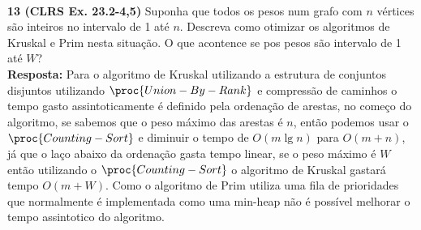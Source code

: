 \\[6pt]
\noindent \textbf{13 (CLRS Ex. 23.2-4,5)} Suponha que todos os pesos num grafo com $n$ vértices são inteiros no intervalo de 1 até $n$. Descreva como otimizar os algoritmos de Kruskal e Prim nesta situação. O que acontence se pos pesos são intervalo de 1 até $W$? 
\\[6pt]
\noindent \textbf{Resposta: } Para o algoritmo de Kruskal utilizando a estrutura de conjuntos disjuntos utilizando $\proc{Union-By-Rank}$ e compressão de caminhos o tempo gasto assintoticamente é definido pela ordenação de arestas, no começo do algoritmo, se sabemos que o peso máximo das arestas é $n$, então podemos usar o $\proc{Counting-Sort}$ e diminuir o tempo de $O(m \lg n)$ para $O(m + n)$, já que o laço abaixo da ordenação gasta tempo linear, se o peso máximo é $W$ então utilizando o $\proc{Counting-Sort}$ o algoritmo de Kruskal gastará tempo $O(m + W)$. Como o algoritmo de Prim utiliza uma fila de prioridades que normalmente é implementada como uma min-heap não é possível melhorar o tempo assintotico do algoritmo.